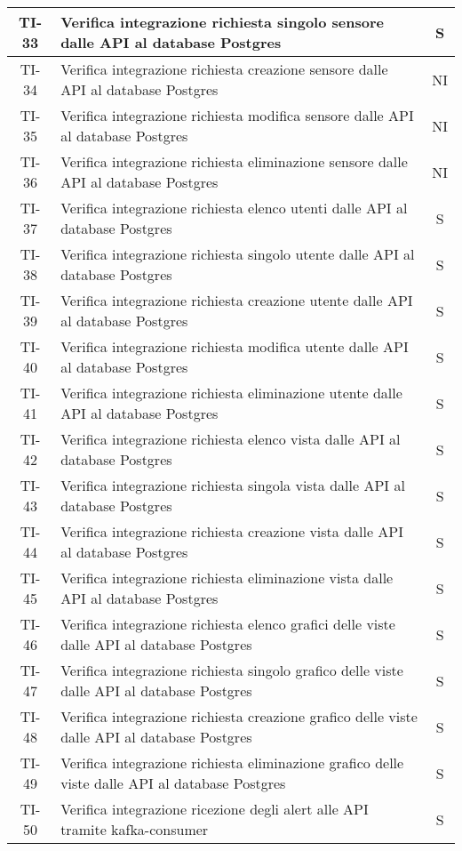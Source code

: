 \begin{center}
\begin{longtable}{|c|p{12cm}|c|}
			\hline
			TI-33 & Verifica integrazione richiesta singolo sensore dalle API al database Postgres & S \\
			\hline
			TI-34 & Verifica integrazione richiesta creazione sensore dalle API al database Postgres & NI \\
			\hline
			TI-35 & Verifica integrazione richiesta modifica sensore dalle API al database Postgres & NI \\
			\hline
			TI-36 & Verifica integrazione richiesta eliminazione sensore dalle API al database Postgres & NI \\
			\hline
			TI-37 & Verifica integrazione richiesta elenco utenti dalle API al database Postgres & S \\
			\hline
			TI-38 & Verifica integrazione richiesta singolo utente dalle API al database Postgres & S \\
			\hline
			TI-39 & Verifica integrazione richiesta creazione utente dalle API al database Postgres & S \\
			\hline
			TI-40 & Verifica integrazione richiesta modifica utente dalle API al database Postgres & S \\
			\hline
			TI-41 & Verifica integrazione richiesta eliminazione utente dalle API al database Postgres & S \\
			\hline
			TI-42 & Verifica integrazione richiesta elenco vista dalle API al database Postgres & S \\
			\hline
			TI-43 & Verifica integrazione richiesta singola vista dalle API al database Postgres & S \\
			\hline
			TI-44 & Verifica integrazione richiesta creazione vista dalle API al database Postgres & S \\
			\hline
			TI-45 & Verifica integrazione richiesta eliminazione vista dalle API al database Postgres & S \\
			\hline
			TI-46 & Verifica integrazione richiesta elenco grafici delle viste dalle API al database Postgres & S \\
			\hline
			TI-47 & Verifica integrazione richiesta singolo grafico delle viste dalle API al database Postgres & S \\
			\hline
			TI-48 & Verifica integrazione richiesta creazione grafico delle viste dalle API al database Postgres & S \\
			\hline
			TI-49 & Verifica integrazione richiesta eliminazione grafico delle viste dalle API al database Postgres & S \\
			\hline
			TI-50 & Verifica integrazione ricezione degli alert alle API tramite kafka-consumer & S \\

\end{longtable}
\end{center}
